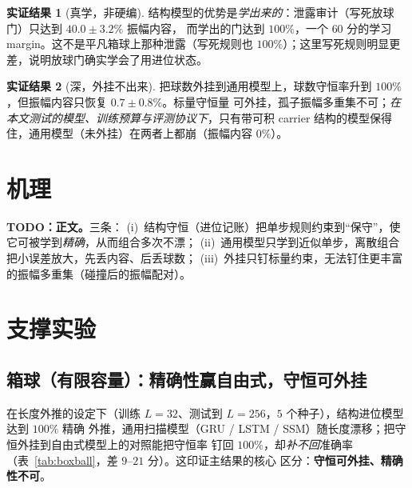 \documentclass[11pt]{article}
\theoremstyle{definition}
\newtheorem{Result}{实证结果}
\theoremstyle{plain}
\begin{document}
\begin{Result}[真学，非硬编]\label{res:genuine}
结构模型的优势是\emph{学出来的}：泄露审计（写死放球门）只达到 $40.0\pm3.2\%$ 振幅内容，
而学出的门达到 $100\%$，一个 $60$ 分的学习 margin。这不是平凡箱球上那种泄露（写死规则也
$100\%$）；这里写死规则明显更差，说明放球门确实学会了用进位状态。
\end{Result}

\begin{Result}[深，外挂不出来]\label{res:depth}
把球数外挂到通用模型上，球数守恒率升到 $100\%$，但振幅内容只恢复 $0.7\pm0.8\%$。标量守恒量
可外挂，孤子振幅多重集不可；\emph{在本文测试的模型、训练预算与评测协议下}，只有带可积
carrier 结构的模型保得住，通用模型（未外挂）在两者上都崩（振幅内容 $0\%$）。
\end{Result}

\section{机理}\label{sec:mechanism}
\textbf{TODO：正文。}三条：
(i)~结构守恒（进位记账）把单步规则约束到“保守”，使它可被学到\emph{精确}，从而组合多次不漂；
(ii)~通用模型只学到近似单步，离散组合把小误差放大，先丢内容、后丢球数；
(iii)~外挂只钉标量约束，无法钉住更丰富的振幅多重集（碰撞后的振幅配对）。

\section{支撑实验}\label{sec:support}

\subsection{箱球（有限容量）：精确性赢自由式，守恒可外挂}\label{sec:support:bbs}
在长度外推的设定下（训练 $L=32$、测试到 $L=256$，$5$ 个种子），结构进位模型达到 $100\%$ 精确
外推，通用扫描模型（GRU / LSTM / SSM）随长度漂移；把守恒外挂到自由式模型上的对照能把守恒率
钉回 $100\%$，却\emph{补不回}准确率（表~\ref{tab:boxball}，差 $9$–$21$ 分）。这印证主结果的核心
区分：\textbf{守恒可外挂、精确性不可}。
\end{document}
